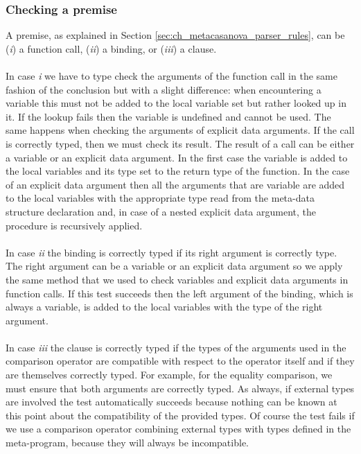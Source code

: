 \subsubsection{Checking a premise}
A premise, as explained in Section \ref{sec:ch_metacasanova_parser_rules}, can be (\textit{i}) a function call, (\textit{ii}) a binding, or (\textit{iii}) a clause.\\\\
In case \textit{i} we have to type check the arguments of the function call in the same fashion of the conclusion but with a slight difference: when encountering a variable this must not be added to the local variable set but rather looked up in it. If the lookup fails then the variable is undefined and cannot be used. The same happens when checking the arguments of explicit data arguments. If the call is correctly typed, then we must check its result. The result of a call can be either a variable or an explicit data argument. In the first case the variable is added to the local variables and its type set to the return type of the function. In the case of an explicit data argument then all the arguments that are variable are added to the local variables with the appropriate type read from the meta-data structure declaration and, in case of a nested explicit data argument, the procedure is recursively applied.\\\\
In case \textit{ii} the binding is correctly typed if its right argument is correctly type. The right argument can be a variable or an explicit data argument so we apply the same method that we used to check variables and explicit data arguments in function calls. If this test succeeds then the left argument of the binding, which is always a variable, is added to the local variables with the type of the right argument.\\\\
In case \textit{iii} the clause is correctly typed if the types of the arguments used in the comparison operator are compatible with respect to the operator itself and if they are themselves correctly typed. For example, for the equality comparison, we must ensure that both arguments are correctly typed. As always, if external types are involved the test automatically succeeds because nothing can be known at this point about the compatibility of the provided types. Of course the test fails if we use a comparison operator combining external types with types defined in the meta-program, because they will always be incompatible.

